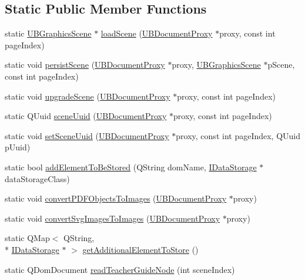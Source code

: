 \subsection*{Static Public Member Functions}
\begin{DoxyCompactItemize}
\item 
static \hyperlink{class_u_b_graphics_scene}{U\-B\-Graphics\-Scene} $\ast$ \hyperlink{class_u_b_svg_subset_adaptor_a5abb38920769f1acbb2cfa21b0c8eb0a}{load\-Scene} (\hyperlink{class_u_b_document_proxy}{U\-B\-Document\-Proxy} $\ast$proxy, const int page\-Index)
\item 
static void \hyperlink{class_u_b_svg_subset_adaptor_ae0246b7ed5045d7515cad861681d7db0}{persist\-Scene} (\hyperlink{class_u_b_document_proxy}{U\-B\-Document\-Proxy} $\ast$proxy, \hyperlink{class_u_b_graphics_scene}{U\-B\-Graphics\-Scene} $\ast$p\-Scene, const int page\-Index)
\item 
static void \hyperlink{class_u_b_svg_subset_adaptor_a1b3ee698579691325ecae28700a02798}{upgrade\-Scene} (\hyperlink{class_u_b_document_proxy}{U\-B\-Document\-Proxy} $\ast$proxy, const int page\-Index)
\item 
static Q\-Uuid \hyperlink{class_u_b_svg_subset_adaptor_ab2a5b5aaae973b7b4217fcca0bc297fa}{scene\-Uuid} (\hyperlink{class_u_b_document_proxy}{U\-B\-Document\-Proxy} $\ast$proxy, const int page\-Index)
\item 
static void \hyperlink{class_u_b_svg_subset_adaptor_a665ab38f71e9d7cfd8ceb868693fb9ca}{set\-Scene\-Uuid} (\hyperlink{class_u_b_document_proxy}{U\-B\-Document\-Proxy} $\ast$proxy, const int page\-Index, Q\-Uuid p\-Uuid)
\item 
static bool \hyperlink{class_u_b_svg_subset_adaptor_abc0a992e8fee16f940e496dcd5b7e3e6}{add\-Element\-To\-Be\-Stored} (Q\-String dom\-Name, \hyperlink{class_i_data_storage}{I\-Data\-Storage} $\ast$data\-Storage\-Class)
\item 
static void \hyperlink{class_u_b_svg_subset_adaptor_a07f94632e63e37cbbbb6c7436cfcac52}{convert\-P\-D\-F\-Objects\-To\-Images} (\hyperlink{class_u_b_document_proxy}{U\-B\-Document\-Proxy} $\ast$proxy)
\item 
static void \hyperlink{class_u_b_svg_subset_adaptor_a394ed7be5d0e0bad50fbde7901e27df6}{convert\-Svg\-Images\-To\-Images} (\hyperlink{class_u_b_document_proxy}{U\-B\-Document\-Proxy} $\ast$proxy)
\item 
static Q\-Map$<$ Q\-String, \\*
\hyperlink{class_i_data_storage}{I\-Data\-Storage} $\ast$ $>$ \hyperlink{class_u_b_svg_subset_adaptor_aaa783efc35f05dd4db4fb82754c21c87}{get\-Additional\-Element\-To\-Store} ()
\item 
static Q\-Dom\-Document \hyperlink{class_u_b_svg_subset_adaptor_acb8a67489951c14cc400d0f96702e576}{read\-Teacher\-Guide\-Node} (int scene\-Index)
\end{DoxyCompactItemize}
